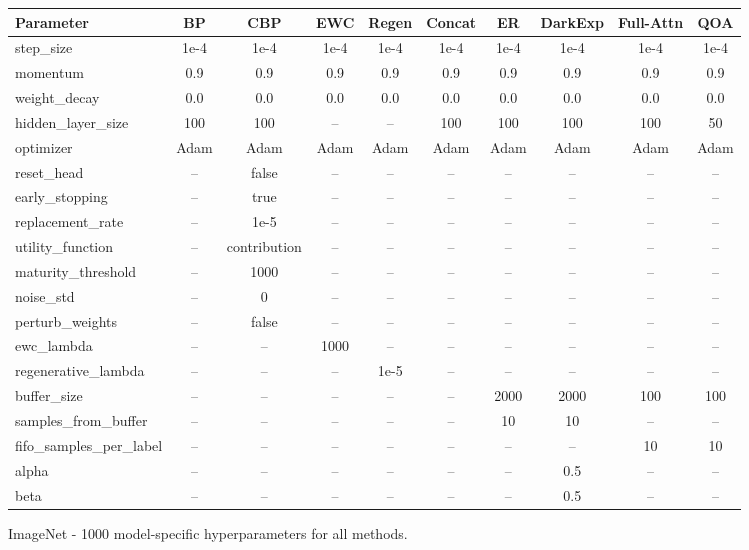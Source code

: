 \documentclass{article}
\begin{document}
\vspace{2mm}
\noindent
\begin{minipage}{\columnwidth}
\centering
\footnotesize
\setlength{\tabcolsep}{3pt}

\begin{tabular}{lccccccccc}
\toprule
\textbf{Parameter} & \textbf{BP} & \textbf{CBP} & \textbf{EWC} & \textbf{Regen} & \textbf{Concat} & \textbf{ER} & \textbf{DarkExp} & \textbf{Full-Attn} & \textbf{QOA} \\
\midrule
step\_size          & 1e-4 & 1e-4 & 1e-4 & 1e-4 & 1e-4 & 1e-4 & 1e-4 & 1e-4 & 1e-4 \\
momentum            & 0.9  & 0.9  & 0.9  & 0.9  & 0.9  & 0.9  & 0.9  & 0.9  & 0.9  \\
weight\_decay       & 0.0  & 0.0  & 0.0  & 0.0  & 0.0  & 0.0  & 0.0  & 0.0  & 0.0  \\
hidden\_layer\_size & 100  & 100  & --   & --   & 100  & 100  & 100  & 100  & 50   \\
optimizer              & Adam & Adam & Adam & Adam & Adam & Adam & Adam & Adam & Adam \\
\midrule
reset\_head         & --   & false & --  & --   & --   & --   & --   & --   & --   \\
early\_stopping     & --   & true  & --  & --   & --   & --   & --   & --   & --   \\
replacement\_rate   & --   & 1e-5  & --  & --   & --   & --   & --   & --   & --   \\
utility\_function   & --   & contribution & -- & -- & -- & -- & -- & -- & -- \\
maturity\_threshold & --   & 1000  & --  & --   & --   & --   & --   & --   & --   \\
noise\_std          & --   & 0     & --  & --   & --   & --   & --   & --   & --   \\
perturb\_weights    & --   & false & --  & --   & --   & --   & --   & --   & --   \\
\midrule
ewc\_lambda         & --   & --    & 1000 & --  & --   & --   & --   & --   & --   \\
regenerative\_lambda& --   & --    & --   & 1e-5 & --  & --   & --   & --   & --   \\
\midrule
buffer\_size        & --   & --    & --   & --   & --   & 2000 & 2000 & 100  & 100  \\
samples\_from\_buffer & -- & --    & --   & --   & --   & 10   & 10   & --   & --   \\
fifo\_samples\_per\_label & -- & -- & --  & --   & --   & --   & --   & 10   & 10   \\
\midrule
alpha               & --   & --    & --   & --   & --   & --   & 0.5  & --   & --   \\
beta                & --   & --    & --   & --   & --   & --   & 0.5  & --   & --   \\
\bottomrule
\end{tabular}

\caption{ImageNet - 1000 model-specific hyperparameters for all methods.}
\label{tab:cifar_model_specs}

\end{minipage}
\end{document}
